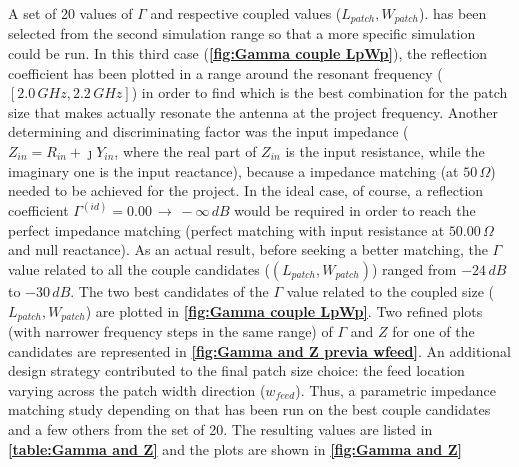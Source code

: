 \documentclass[10 pt,a4paper,twocolumn]{article}
\begin{document}
{%
A set of 20 values of $\Gamma$ and respective coupled values ($L_{patch},W_{patch}$). has been selected from the second simulation range so that a more specific simulation could be run. In this third case (\textbf{\cref{fig:Gamma couple LpWp}}), the reflection coefficient has been plotted in a range around the resonant frequency ($[2.0\,GHz, 2.2\,GHz]$) in order to find which is the best combination for the patch size that makes actually resonate the antenna at the project frequency. Another determining and discriminating factor was the input impedance ($Z_{in}=R_{in}+\jmath Y_{in}$, where the real part of $Z_{in}$ is the input resistance, while the imaginary one is the input reactance), because a impedance matching (at $50\,\Omega$) needed to be achieved for the project. In the ideal case, of course, a reflection coefficient $\Gamma^{(id)}=0.00\,\to\,-\infty\,dB$ would be required in order to reach the perfect impedance matching (perfect matching with input resistance at $50.00\,\Omega$ and null reactance). As an actual result, before seeking a better matching, the $\Gamma$ value related to all the couple candidates ($(L_{patch},W_{patch})$) ranged from $-24\,dB$ to $-30\,dB$. The two best candidates of the $\Gamma$ value related to the coupled size ($L_{patch},W_{patch}$) are plotted in \textbf{\cref{fig:Gamma couple LpWp}}. Two refined plots (with narrower frequency steps in the same range) of $\Gamma$ and $Z$ for one of the candidates are represented in \textbf{\cref{fig:Gamma and Z previa wfeed}}. An additional design strategy contributed to the final patch size choice: the feed location varying across the patch width direction ($w_{feed}$). Thus, a parametric impedance matching study depending on that has been run on the best couple candidates and a few others from the set of 20. The resulting values are listed in \textbf{\cref{table:Gamma and Z}} and the plots are shown in \textbf{\cref{fig:Gamma and Z}}


}
\end{document}
